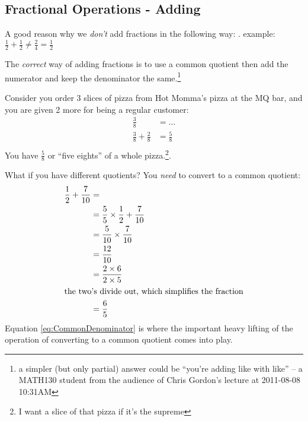 \subsection{Fractional Operations - Adding}
\label{sec:FractionalOperationsAdding}
A good reason why we \emph{don't} add fractions in the following way:
.
example: $\frac{1}{2} + \frac{1}{2} \neq \frac{2}{4} = \frac{1}{2}$

The \emph{correct} way of adding fractions is to use a common quotient then add
the numerator and keep the denominator the same.\footnote{a simpler (but only
partial) answer could be ``you're adding like with like'' -- a MATH130 student
from the audience of Chris Gordon's lecture at 2011-08-08 10:31AM}

Consider you order 3 slices of pizza from Hot Momma's pizza at the MQ bar, and
you are given 2 more for being a regular customer:
\begin{align}
  \frac{3}{8} & = \ldots \\
  \frac{3}{8} + \frac{2}{8} & = \frac{5}{8} \\
\end{align}
You have $\frac{5}{8}$ or ``five eights'' of a whole pizza.\footnote{I want a
slice of that pizza if it's the supreme}.

What if you have different quotients? You \emph{need} to convert to a common
quotient:
\begin{align}
 \frac{1}{2} + \frac{7}{10} & = \\
    & = \frac{5}{5} \times \frac{1}{2} + \frac{7}{10} \\
    & = \frac{5}{10} \times \frac{7}{10} \label{eq:CommonDenominator}\\
    & = \frac{12}{10} \\
    & = \frac{2 \times 6}{2 \times 5} \\
  \intertext{the two's divide out, which simplifies the fraction}  
    & = \frac{6}{5} \\
\end{align}
Equation \ref{eq:CommonDenominator} is where the important heavy lifting of the
operation of converting to a common quotient comes into play.

